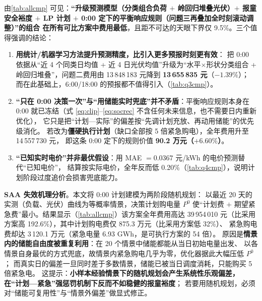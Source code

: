 \documentclass[12pt,a4paper,fontset=fandol]{ctexart}
\begin{document}
由\cref{tab:allcmp} 可见\nobreak：\textbf{“升级预测模型（分类组合负荷 $+$ 岭回归堆叠光伏\nobreak）$+$
报童安全裕度 $+$ LP 计划 $+$ 0:00 定下的平衡响应规则（问题三再叠加全时刻滚动调整\nobreak）\nobreak”的组合
在所有可比方案中费用最低}\nobreak，且距不可达的天眼下界仅 9.5\%\nobreak。三个值得强调的结论\nobreak：

\begin{enumerate}[label=(\arabic*), leftmargin=2.2em, itemsep=1pt]
\item \textbf{用统计/机器学习方法提升预测精度\nobreak，比引入更多预报时刻更有效}\nobreak：
把 0:00 依据从“近 4 个同类日均值 + 近 4 日光伏均值\nobreak”升级为“水平$\times$形状分类组合 +
岭回归堆叠\nobreak”\nobreak，问题二费用由 13\,848\,183 元降到 \textbf{13\,655\,835 元}（$-1.39\text{\%}$\nobreak）\nobreak；
而在此基础上\nobreak，6:00/18:00 的预报都不值得引入（\cref{tab:q3cmp}\nobreak）\nobreak。
\item \textbf{“只在 0:00 决策一次\nobreak”与“用储能实时兜底\nobreak”并不矛盾}\nobreak：平衡响应规则本身在 0:00
就已冻结（式 \eqref{eq:clip}--\eqref{eq:socrec} 不含任何未来信息\nobreak，也不需要日内重新优化\nobreak）\nobreak，
它只是把“计划—实际\nobreak”的偏差按“先调计划充放\nobreak、再动用储能\nobreak”的优先级消化\nobreak。
若改为\textbf{僵硬执行计划}（缺口全部按 5 倍紧急购电\nobreak）\nobreak，全年费用升至 14\,557\,730 元\nobreak，
即这条 0:00 定下的规则价值 \textbf{90.2 万元（$+6.60\text{\%}$\nobreak）}\nobreak。
\item \textbf{“已知实时电价\nobreak”并非最优假设}\nobreak：用 MAE $=0.0367$ 元/kWh 的电价预测替代“已知电价\nobreak”\nobreak，
结算按实际电价\nobreak，全年反而低 0.20\%（\cref{tab:q4cmp}\nobreak）\nobreak，说明计划阶段过度追价会损害兜底能力\nobreak。
\end{enumerate}

\textbf{SAA 失效机理分析}\nobreak。本文将 0:00 计划建模为两阶段随机规划\cite{vtpp}\nobreak：
以最近 20 天的实测（负载\nobreak、光伏\nobreak）曲线为等概率情景\nobreak，决策计划购电量 $P^0$
使“计划费 $+$ 期望紧急费\nobreak”最小\nobreak。结果显示（\cref{tab:allcmp}\nobreak）该方案全年费用高达
39\,954\,010 元（比采用方案高 192.6\%\nobreak）\nobreak，其中计划购电费仅 875.3 万元（比采用方案低 32\%\nobreak）\nobreak、
紧急购电费却达 3\,120.1 万元（紧急电量 6.93 GWh\nobreak，是可执行方案的 54 倍\nobreak）\nobreak。
原因是\textbf{情景内的储能自由度被重复利用}\nobreak：在 20 个情景中储能都能从当日初始电量出发\nobreak、
以各情景自身最优的方式兜底\nobreak，故情景内紧急购电几乎为零\nobreak，优化器据此大幅压低 $P^0$\nobreak；
而真实日的偏差一旦同时差于多数情景\nobreak，储能已被当日调度消耗\nobreak，只能购买 5 倍紧急电\nobreak。
这提示\nobreak：\textbf{小样本经验情景下的随机规划会产生系统性乐观偏差\nobreak，
在“计划—紧急\nobreak”强惩罚机制下反而不如稳健的报童裕度}\nobreak；
若要用随机规划\nobreak，必须对“储能可复用性\nobreak”与“情景外偏差\nobreak”做显式修正\nobreak。
\end{document}

